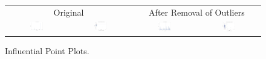 \documentclass[11pt]{scrartcl} %
\begin{document}
\begin{figure}[H] %
	\centering
	\begin{tabular}{p{} p{}p{}p{}}
\hline	
	\multicolumn{2}{|c|}{Original} &  \multicolumn{2}{|c|}{After Removal of Outliers} \\
		\multicolumn{1}{|c}{\includegraphics[width=0.23\textwidth]{../graphics/A1Cooks1}} &
		\multicolumn{1}{c|}{\includegraphics[width=0.23\textwidth]{../graphics/A1Lev1}} &
		\multicolumn{1}{|c}{\includegraphics[width=0.23\textwidth]{../graphics/A1Cooks2}} &
		\multicolumn{1}{c|}{\includegraphics[width=0.23\textwidth]{../graphics/A1Lev2}}\\
		\hline
	\end{tabular}		
	\caption{Influential Point Plots.} %
	\label{fig:A1IP}
\end{figure}
\end{document}
